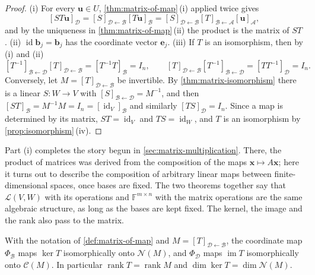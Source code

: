 \begin{proof}
(i) For every $\mathbf u\in U$, \cref{thm:matrix-of-map}\,(i) applied twice gives
\[
[ST\mathbf u]_{\mathcal D}=[S]_{\mathcal D\leftarrow\mathcal B}[T\mathbf u]_{\mathcal B}=[S]_{\mathcal D\leftarrow\mathcal B}[T]_{\mathcal B\leftarrow\mathcal A}[\mathbf u]_{\mathcal A},
\]
and by the uniqueness in \cref{thm:matrix-of-map}\,(ii) the product is the matrix of $ST$. (ii) $\operatorname{id}\mathbf b_j=\mathbf b_j$ has the coordinate vector $\mathbf e_j$. (iii) If $T$ is an isomorphism, then by (i) and (ii)
\[
[T^{-1}]_{\mathcal B\leftarrow\mathcal D}[T]_{\mathcal D\leftarrow\mathcal B}=[T^{-1}T]_{\mathcal B}=I_n,\qquad[T]_{\mathcal D\leftarrow\mathcal B}[T^{-1}]_{\mathcal B\leftarrow\mathcal D}=[TT^{-1}]_{\mathcal D}=I_n .
\]
Conversely, let $M=[T]_{\mathcal D\leftarrow\mathcal B}$ be invertible. By \cref{thm:matrix-isomorphism} there is a linear $S\colon W\to V$ with $[S]_{\mathcal B\leftarrow\mathcal D}=M^{-1}$, and then $[ST]_{\mathcal B}=M^{-1}M=I_n=[\operatorname{id}_V]_{\mathcal B}$ and similarly $[TS]_{\mathcal D}=I_n$. Since a map is determined by its matrix, $ST=\operatorname{id}_V$ and $TS=\operatorname{id}_W$, and $T$ is an isomorphism by \cref{prop:isomorphism}\,(iv).
\end{proof}

Part (i) completes the story begun in \cref{sec:matrix-multiplication}. There, the product of matrices was derived from the composition of the maps $\mathbf x\mapsto A\mathbf x$; here it turns out to describe the composition of arbitrary linear maps between finite-dimensional spaces, once bases are fixed. The two theorems together say that $\mathcal L(V,W)$ with its operations and $\mathbb F^{m\times n}$ with the matrix operations are the same algebraic structure, as long as the bases are kept fixed. The kernel, the image and the rank also pass to the matrix.

\begin{proposition}
\label{prop:rank-of-matrix}
With the notation of \cref{def:matrix-of-map} and $M=[T]_{\mathcal D\leftarrow\mathcal B}$, the coordinate map $\Phi_{\mathcal B}$ maps $\ker T$ isomorphically onto $\mathcal N(M)$, and $\Phi_{\mathcal D}$ maps $\operatorname{im}T$ isomorphically onto $\mathcal C(M)$. In particular $\operatorname{rank}T=\operatorname{rank}M$ and $\dim\ker T=\dim\mathcal N(M)$.
\end{proposition}

